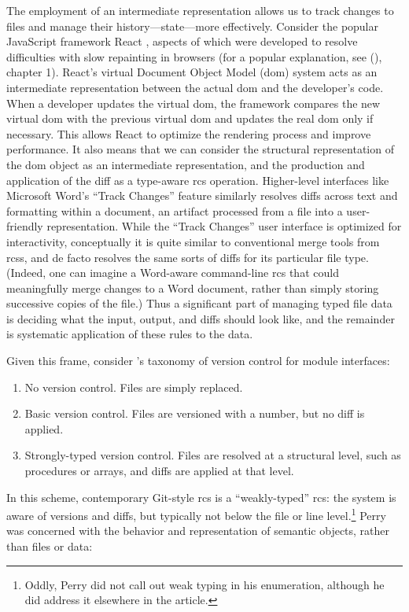 \documentclass[twoside]{article}
\begin{document}
\noindent
The employment of an intermediate representation allows us to track changes to files and manage their history—state—more effectively.  Consider the popular JavaScript framework React \citep{React}, aspects of which were developed to resolve difficulties with slow repainting in browsers (for a popular explanation, see \citeauthor{Baer2018} (\citeyear{Baer2018}), chapter 1).  React's virtual Document Object Model ({\sc dom}) system acts as an intermediate representation between the actual {\sc dom} and the developer's code.  When a developer updates the virtual {\sc dom}, the framework compares the new virtual {\sc dom} with the previous virtual {\sc dom} and updates the real {\sc dom} only if necessary.  This allows React to optimize the rendering process and improve performance.  It also means that we can consider the structural representation of the {\sc dom} object as an intermediate representation, and the production and application of the diff as a type-aware {\sc rcs} operation.  Higher-level interfaces like Microsoft Word's “Track Changes” feature \citep{MS2024} similarly resolves diffs across text and formatting within a document, an artifact processed from a file into a user-friendly representation.  While the “Track Changes” user interface is optimized for interactivity, conceptually it is quite similar to conventional merge tools from {\sc rcs}s, and de facto resolves the same sorts of diffs for its particular file type.  (Indeed, one can imagine a Word-aware command-line {\sc rcs} that could meaningfully merge changes to a Word document, rather than simply storing successive copies of the file.)  Thus a significant part of managing typed file data is deciding what the input, output, and diffs should look like, and the remainder is systematic application of these rules to the data.

Given this frame, consider \citeauthor{Perry1987}'s taxonomy of version control for module interfaces:

\begin{enumerate}
  \item  No version control.  Files are simply replaced.
  \item  Basic version control.  Files are versioned with a number, but no diff is applied.
  \item  Strongly-typed version control.  Files are resolved at a structural level, such as procedures or arrays, and diffs are applied at that level.
\end{enumerate}

\noindent
In this scheme, contemporary Git-style {\sc rcs} is a ``weakly-typed'' {\sc rcs}:  the system is aware of versions and diffs, but typically not below the file or line level.\footnote{Oddly, Perry did not call out weak typing in his enumeration, although he did address it elsewhere in the article.}  Perry was concerned with the behavior and representation of semantic objects, rather than files or data:
\end{document}
